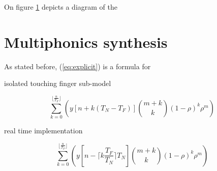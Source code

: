 \documentclass{sigchi}
\begin{document}
\begin{figure}[h]
	\centering
	\scalebox{1}{}
	\caption{}
	\label{fig:triangle}
\end{figure}

On figure \ref{fig:triangle} depicts a diagram of the 

\section{Multiphonics synthesis}
As stated before, (\ref{eq:explicit}) is a formula for

isolated touching finger sub-model

\begin{equation}
	\sum_{k=0}^{\lfloor \frac{n}{T_F} \rfloor}\left(y[n + k(T_N-T_F)]\binom{m+k}{k} (1 - \rho)^{k} \rho^m\right)
\end{equation}

% 

real time implementation

\begin{equation}
	\sum_{k=0}^{\lfloor \frac{n}{T_F} \rfloor}\left(y[n - \lceil k\frac{T_F}{T_N}\rceil T_N] \binom{m+k}{k} (1 - \rho)^{k} \rho^m\right)
\end{equation}





\end{document}
